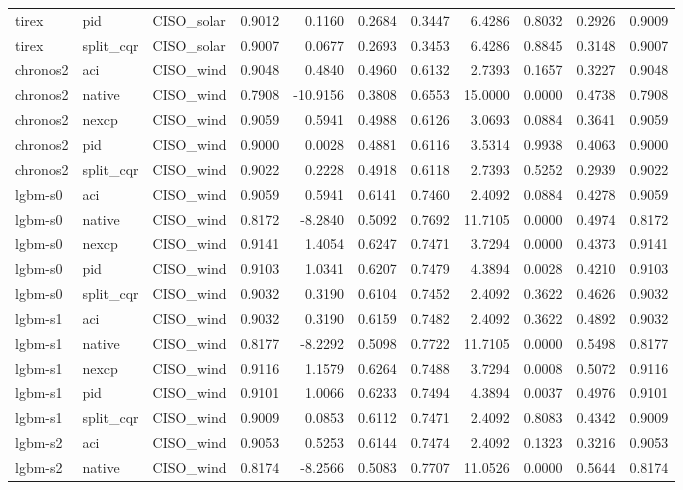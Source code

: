 \begin{tabular}{lllrrrrrrrr}
tirex & pid & CISO_solar & 0.9012 & 0.1160 & 0.2684 & 0.3447 & 6.4286 & 0.8032 & 0.2926 & 0.9009 \\
tirex & split_cqr & CISO_solar & 0.9007 & 0.0677 & 0.2693 & 0.3453 & 6.4286 & 0.8845 & 0.3148 & 0.9007 \\
chronos2 & aci & CISO_wind & 0.9048 & 0.4840 & 0.4960 & 0.6132 & 2.7393 & 0.1657 & 0.3227 & 0.9048 \\
chronos2 & native & CISO_wind & 0.7908 & -10.9156 & 0.3808 & 0.6553 & 15.0000 & 0.0000 & 0.4738 & 0.7908 \\
chronos2 & nexcp & CISO_wind & 0.9059 & 0.5941 & 0.4988 & 0.6126 & 3.0693 & 0.0884 & 0.3641 & 0.9059 \\
chronos2 & pid & CISO_wind & 0.9000 & 0.0028 & 0.4881 & 0.6116 & 3.5314 & 0.9938 & 0.4063 & 0.9000 \\
chronos2 & split_cqr & CISO_wind & 0.9022 & 0.2228 & 0.4918 & 0.6118 & 2.7393 & 0.5252 & 0.2939 & 0.9022 \\
lgbm-s0 & aci & CISO_wind & 0.9059 & 0.5941 & 0.6141 & 0.7460 & 2.4092 & 0.0884 & 0.4278 & 0.9059 \\
lgbm-s0 & native & CISO_wind & 0.8172 & -8.2840 & 0.5092 & 0.7692 & 11.7105 & 0.0000 & 0.4974 & 0.8172 \\
lgbm-s0 & nexcp & CISO_wind & 0.9141 & 1.4054 & 0.6247 & 0.7471 & 3.7294 & 0.0000 & 0.4373 & 0.9141 \\
lgbm-s0 & pid & CISO_wind & 0.9103 & 1.0341 & 0.6207 & 0.7479 & 4.3894 & 0.0028 & 0.4210 & 0.9103 \\
lgbm-s0 & split_cqr & CISO_wind & 0.9032 & 0.3190 & 0.6104 & 0.7452 & 2.4092 & 0.3622 & 0.4626 & 0.9032 \\
lgbm-s1 & aci & CISO_wind & 0.9032 & 0.3190 & 0.6159 & 0.7482 & 2.4092 & 0.3622 & 0.4892 & 0.9032 \\
lgbm-s1 & native & CISO_wind & 0.8177 & -8.2292 & 0.5098 & 0.7722 & 11.7105 & 0.0000 & 0.5498 & 0.8177 \\
lgbm-s1 & nexcp & CISO_wind & 0.9116 & 1.1579 & 0.6264 & 0.7488 & 3.7294 & 0.0008 & 0.5072 & 0.9116 \\
lgbm-s1 & pid & CISO_wind & 0.9101 & 1.0066 & 0.6233 & 0.7494 & 4.3894 & 0.0037 & 0.4976 & 0.9101 \\
lgbm-s1 & split_cqr & CISO_wind & 0.9009 & 0.0853 & 0.6112 & 0.7471 & 2.4092 & 0.8083 & 0.4342 & 0.9009 \\
lgbm-s2 & aci & CISO_wind & 0.9053 & 0.5253 & 0.6144 & 0.7474 & 2.4092 & 0.1323 & 0.3216 & 0.9053 \\
lgbm-s2 & native & CISO_wind & 0.8174 & -8.2566 & 0.5083 & 0.7707 & 11.0526 & 0.0000 & 0.5644 & 0.8174 \\

\end{tabular}
